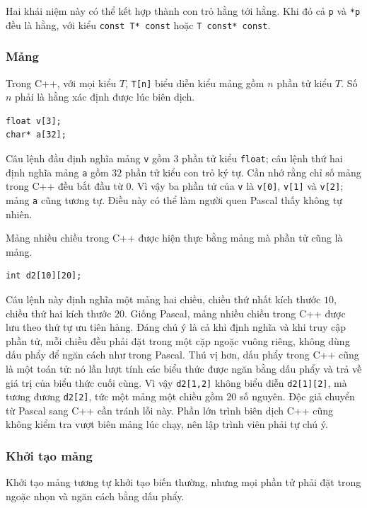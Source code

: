 \documentclass[11pt]{article}
\newcommand{\cpp}{C++}
\newcommand{\pascal}{Pascal}
\begin{document}
Hai khái niệm này có thể kết hợp thành con trỏ hằng tới hằng. Khi đó cả
\verb|p| và \verb|*p| đều là hằng, với kiểu \verb|const T* const| hoặc
\verb|T const* const|.

\subsubsection*{Mảng}

Trong \cpp{}, với mọi kiểu \(T\), \verb|T[n]| biểu diễn kiểu mảng gồm \(n\)
phần tử kiểu \(T\). Số \(n\) phải là hằng xác định được lúc biên dịch.

\begin{verbatim}
float v[3];
char* a[32];
\end{verbatim}

Câu lệnh đầu định nghĩa mảng \verb|v| gồm \(3\) phần tử kiểu \verb|float|;
câu lệnh thứ hai định nghĩa mảng \verb|a| gồm \(32\) phần tử kiểu con trỏ ký
tự. Cần nhớ rằng chỉ số mảng trong \cpp{} đều bắt đầu từ \(0\). Vì vậy ba
phần tử của \verb|v| là \verb|v[0]|, \verb|v[1]| và \verb|v[2]|; mảng
\verb|a| cũng tương tự. Điều này có thể làm người quen \pascal{} thấy không
tự nhiên.

Mảng nhiều chiều trong \cpp{} được hiện thực bằng mảng mà phần tử cũng là
mảng.

\begin{verbatim}
int d2[10][20];
\end{verbatim}

Câu lệnh này định nghĩa một mảng hai chiều, chiều thứ nhất kích thước \(10\),
chiều thứ hai kích thước \(20\). Giống \pascal{}, mảng nhiều chiều trong
\cpp{} được lưu theo thứ tự ưu tiên hàng. Đáng chú ý là cả khi định nghĩa và
khi truy cập phần tử, mỗi chiều đều phải đặt trong một cặp ngoặc vuông riêng,
không dùng dấu phẩy để ngăn cách như trong \pascal{}. Thú vị hơn, dấu phẩy
trong \cpp{} cũng là một toán tử: nó lần lượt tính các biểu thức được ngăn
bằng dấu phẩy và trả về giá trị của biểu thức cuối cùng. Vì vậy \verb|d2[1,2]|
không biểu diễn \verb|d2[1][2]|, mà tương đương \verb|d2[2]|, tức một mảng
một chiều gồm \(20\) số nguyên. Độc giả chuyển từ \pascal{} sang \cpp{} cần
tránh lỗi này. Phần lớn trình biên dịch \cpp{} cũng không kiểm tra vượt biên
mảng lúc chạy, nên lập trình viên phải tự chú ý.

\subsubsection*{Khởi tạo mảng}

Khởi tạo mảng tương tự khởi tạo biến thường, nhưng mọi phần tử phải đặt trong
ngoặc nhọn và ngăn cách bằng dấu phẩy.
\end{document}
